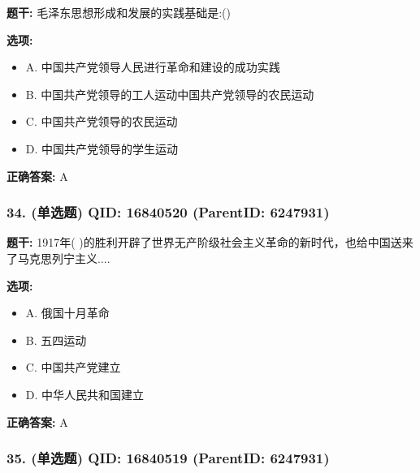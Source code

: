 \documentclass[12pt,UTF8]{ctexart}
\begin{document}
\textbf{题干:}
毛泽东思想形成和发展的实践基础是:()



\textbf{选项:}
\begin{itemize}[leftmargin=*]

  \item A. 中国共产党领导人民进行革命和建设的成功实践

  \item B. 中国共产党领导的工人运动中国共产党领导的农民运动

  \item C. 中国共产党领导的农民运动

  \item D. 中国共产党领导的学生运动

\end{itemize}

\textbf{正确答案:}
A

\vspace{0.3em}\hrulefill\vspace{0.7em}

\subsubsection*{34. (单选题) \small QID: 16840520 (ParentID: 6247931)}

\textbf{题干:}
1917年( )的胜利开辟了世界无产阶级社会主义革命的新时代，也给中国送来了马克思列宁主义....



\textbf{选项:}
\begin{itemize}[leftmargin=*]

  \item A. 俄国十月革命

  \item B. 五四运动

  \item C. 中国共产党建立

  \item D. 中华人民共和国建立

\end{itemize}

\textbf{正确答案:}
A

\vspace{0.3em}\hrulefill\vspace{0.7em}

\subsubsection*{35. (单选题) \small QID: 16840519 (ParentID: 6247931)}
\end{document}
